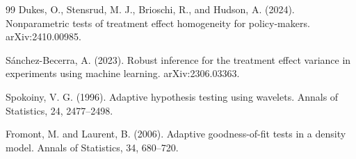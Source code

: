 \documentclass{article}
\begin{document}
\begin{thebibliography}{99}
   Dukes, O., Stensrud, M. J., Brioschi, R., and Hudson, A. (2024). Nonparametric tests of treatment effect homogeneity for policy-makers. arXiv:2410.00985.

   Sánchez-Becerra, A. (2023). Robust inference for the treatment effect variance in experiments using machine learning. arXiv:2306.03363.

   Spokoiny, V. G. (1996). Adaptive hypothesis testing using wavelets. Annals of Statistics, 24, 2477--2498.

   Fromont, M. and Laurent, B. (2006). Adaptive goodness-of-fit tests in a density model. Annals of Statistics, 34, 680--720.

\end{thebibliography}
\end{document}
